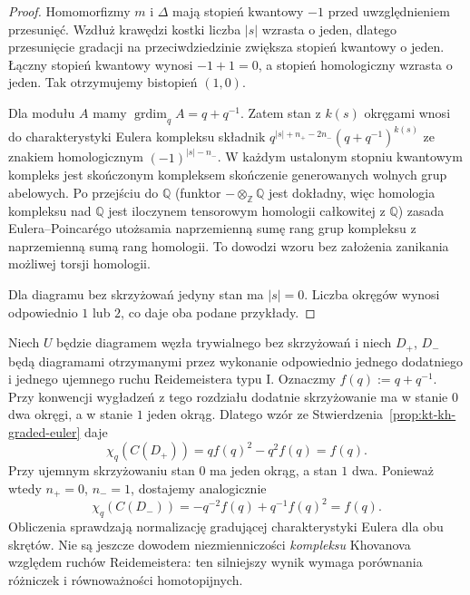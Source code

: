 \begin{proof}
Homomorfizmy $m$ i $\Delta$ mają
stopień kwantowy $-1$
przed uwzględnieniem przesunięć.
Wzdłuż krawędzi kostki liczba
$|s|$ wzrasta o jeden, dlatego
przesunięcie gradacji na
przeciwdziedzinie zwiększa
stopień kwantowy o jeden.
Łączny stopień kwantowy
wynosi $-1+1=0$,
a stopień homologiczny wzrasta
o jeden. Tak otrzymujemy
bistopień $(1,0)$.

Dla modułu $A$ mamy
$\operatorname{grdim}_q A=q+q^{-1}$.
Zatem stan z $k(s)$ okręgami
wnosi do charakterystyki
Eulera kompleksu składnik
$q^{|s|+n_+-2n_-}(q+q^{-1})^{k(s)}$
ze znakiem homologicznym
$(-1)^{|s|-n_-}$.
W każdym ustalonym stopniu
kwantowym kompleks jest
skończonym kompleksem
skończenie generowanych
wolnych grup abelowych.
Po przejściu do $\mathbb Q$
(funktor $-\otimes_{\mathbb Z}\mathbb Q$ jest dokładny,
więc homologia kompleksu nad $\mathbb Q$ jest
iloczynem tensorowym homologii całkowitej z $\mathbb Q$)
zasada Eulera--Poincarégo
utożsamia naprzemienną
sumę rang grup kompleksu
z naprzemienną sumą
rang homologii. To dowodzi
wzoru bez założenia zanikania
możliwej torsji homologii.

Dla diagramu bez skrzyżowań
jedyny stan ma $|s|=0$.
Liczba okręgów wynosi
odpowiednio $1$ lub $2$,
co daje oba podane przykłady.
\end{proof}

\begin{przyklad}
\label{ex:kt-kh-reidemeister-one-euler}
Niech $U$ będzie diagramem węzła trywialnego
bez skrzyżowań i niech $D_+$, $D_-$ będą
diagramami otrzymanymi przez wykonanie
odpowiednio jednego dodatniego i
jednego ujemnego ruchu Reidemeistera typu I.
Oznaczmy $f(q):=q+q^{-1}$.
Przy konwencji wygładzeń z tego rozdziału
dodatnie skrzyżowanie ma w stanie $0$
dwa okręgi, a w stanie $1$ jeden okrąg.
Dlatego wzór ze
Stwierdzenia~\ref{prop:kt-kh-graded-euler}
daje
\[
\chi_q(C(D_+))=qf(q)^2-q^2f(q)=f(q).
\]
Przy ujemnym skrzyżowaniu stan $0$
ma jeden okrąg, a stan $1$ dwa.
Ponieważ wtedy $n_+=0$, $n_-=1$,
dostajemy analogicznie
\[
\chi_q(C(D_-))
=-q^{-2}f(q)+q^{-1}f(q)^2=f(q).
\]
Obliczenia sprawdzają normalizację
gradującej charakterystyki Eulera
dla obu skrętów. Nie są jeszcze
dowodem niezmienniczości \emph{kompleksu}
Khovanova względem ruchów Reidemeistera:
ten silniejszy wynik wymaga
porównania różniczek i równoważności
homotopijnych.
\end{przyklad}

